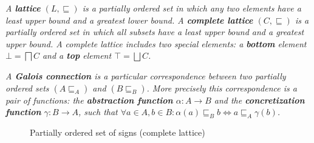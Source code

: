 \begin{definition}\label{def:lattice}
\textit{A \textbf{lattice} $(L,\sqsubseteq)$ is a partially ordered set in which any two elements have a least upper bound and a greatest lower bound. A \textbf{complete lattice} $(C,\sqsubseteq)$ is a partially ordered set in which all subsets have a least upper bound and a greatest upper bound. A complete lattice includes two special elements: a \textbf{bottom} element $\bot = \bigsqcap C$ and a \textbf{top} element $\top = \bigsqcup C$.}
\end{definition}

\begin{definition}
\textit{A \textbf{Galois connection} is a particular correspondence between two partially ordered sets $(A\sqsubseteq_A)$ and $(B\sqsubseteq_B)$. More precisely this correspondence is a pair of functions: the \textbf{abstraction function} $\alpha : A \rightarrow B$ and the \textbf{concretization function} $\gamma : B \rightarrow A$, such that $\forall a \in A, b \in B: \alpha(a) \sqsubseteq_B b \Leftrightarrow a \sqsubseteq_A \gamma(b)$.}
\end{definition}

\begin{figure}
\centering
\caption{Partially ordered set of signs (complete lattice)}
\label{fig:lattice}
\end{figure}

